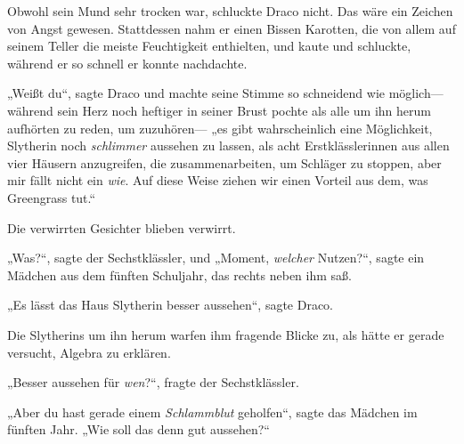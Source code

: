 Obwohl sein Mund sehr trocken war, schluckte Draco nicht. Das wäre ein Zeichen von Angst gewesen. Stattdessen nahm er einen Bissen Karotten, die von allem auf seinem Teller die meiste Feuchtigkeit enthielten, und kaute und schluckte, während er so schnell er konnte nachdachte.

„Weißt du“, sagte Draco und machte seine Stimme so schneidend wie möglich—während sein Herz noch heftiger in seiner Brust pochte als alle um ihn herum aufhörten zu reden, um zuzuhören— „es gibt wahrscheinlich eine Möglichkeit, Slytherin noch \emph{schlimmer} aussehen zu lassen, als acht Erstklässlerinnen aus allen vier Häusern anzugreifen, die zusammenarbeiten, um Schläger zu stoppen, aber mir fällt nicht ein \emph{wie}. Auf diese Weise ziehen wir einen Vorteil aus dem, was Greengrass tut.“

Die verwirrten Gesichter blieben verwirrt.

„Was?“, sagte der Sechstklässler, und „Moment, \emph{welcher} Nutzen?“, sagte ein Mädchen aus dem fünften Schuljahr, das rechts neben ihm saß.

„Es lässt das Haus Slytherin besser aussehen“, sagte Draco.

Die Slytherins um ihn herum warfen ihm fragende Blicke zu, als hätte er gerade versucht, Algebra zu erklären.

„Besser aussehen für \emph{wen}?“, fragte der Sechstklässler.

„Aber du hast gerade einem \emph{Schlammblut} geholfen“, sagte das Mädchen im fünften Jahr. „Wie soll das denn gut aussehen?“

